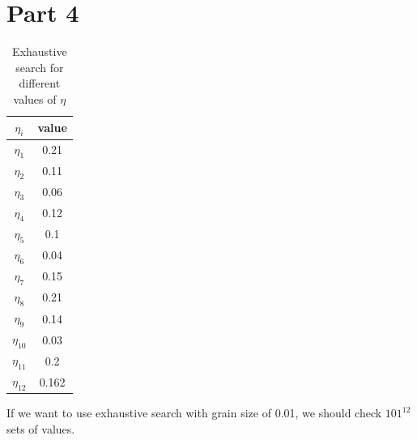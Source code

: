 \documentclass[a4paper]{article}
\begin{document}
\section{Part 4}


\begin{table}[H]
\centering
\begin{tabular}{c|c}
\textbf{$\eta_{i}$} & \textbf{value} \\ \hline
                            
$\eta_{1}$ & 0.21 \\                                       
$\eta_{2}$ & 0.11 \\ 
$\eta_{3}$ & 0.06 \\ 
$\eta_{4}$ & 0.12 \\ 
$\eta_{5}$ & 0.1 \\ 
$\eta_{6}$ & 0.04 \\ 
$\eta_{7}$ & 0.15 \\ 
$\eta_{8}$ & 0.21 \\ 
$\eta_{9}$ & 0.14 \\ 
$\eta_{10}$ & 0.03 \\ 
$\eta_{11}$ & 0.2 \\ 
$\eta_{12}$ & 0.162 \\ 

\end{tabular}
\caption{Exhaustive search for different values of $\eta$}
\label{tab:exaustive_searchSSR}
\end{table}

If we want to use exhaustive search with grain size of 0.01, we should check $101^{12}$ sets of values.
\end{document}
